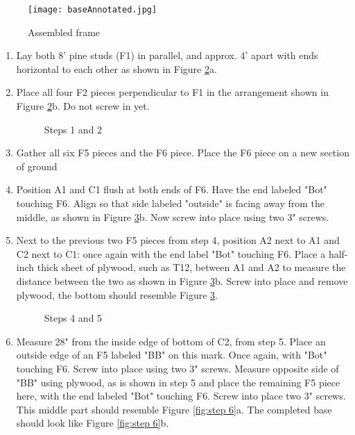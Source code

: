 \documentclass[11pt,english]{article}
\begin{document}
\begin{figure}[ht!]
\centering
\texttt{[image: baseAnnotated.jpg]}
\caption{Assembled frame}
\label{fig:baseAnnotated}
\end{figure}
\begin{enumerate}


\item Lay both 8’ pine studs (F1) in parallel, and approx. 4’ apart with ends horizontal to each other as shown in Figure \ref{fig:Layout}a.

\item Place all four F2 pieces perpendicular to F1 in the arrangement shown in Figure \ref{fig:Layout}b.  Do not screw in yet.

\begin{figure}[ht!]%
    \centering
    \qquad
    \caption{Steps 1 and 2}%
    \label{fig:Layout}%
\end{figure}

\newpage
\item Gather all six F5 pieces and the F6 piece. Place the F6 piece on a new section of ground  


\item Position A1 and C1 flush at both ends of F6. Have the end labeled "Bot" touching F6. Align so that side labeled "outside" is facing away from the middle, as shown in Figure \ref{fig:step 4 and 5}b. Now screw into place using two 3" screws.  

\item Next to the previous two F5 pieces from step 4, position A2 next to A1 and C2 next to C1: once again with the end label "Bot" touching F6. Place a half-inch thick sheet of plywood, such as T12, between A1 and A2 to measure the distance between the two as shown in Figure \ref{fig:step 4 and 5}b. Screw into place and remove plywood, the bottom should resemble Figure \ref{fig:step 4 and 5}.   
 \begin{figure}[ht!]%
    \centering
    \qquad
    \caption{Steps 4 and 5}%
    \label{fig:step 4 and 5}%
\end{figure}

\item Measure 28" from the inside edge of bottom of C2, from step 5. Place an outside edge of an F5 labeled "BB" on this mark. Once again, with "Bot" touching F6. Screw into place using two 3" screws. Measure opposite side of "BB" using plywood, as is shown in step 5 and place the remaining F5 piece here, with the end labeled "Bot" touching F6. Screw into place two 3" screws. This middle part should resemble Figure \ref{fig:step 6}a. The completed base should look like Figure \ref{fig:step 6}b.   


\end{enumerate}
\end{document}
